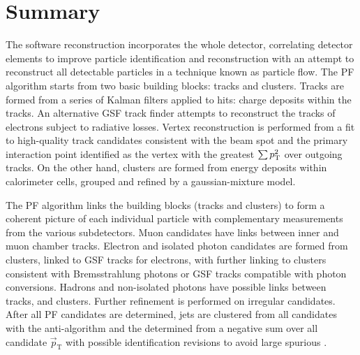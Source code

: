 \section{Summary}

The \CMS software reconstruction incorporates the whole detector, correlating detector elements to improve particle identification and reconstruction with an attempt to reconstruct all detectable particles in a technique known as particle flow. The PF algorithm starts from two basic building blocks: tracks and clusters. Tracks are formed from a series of Kalman filters applied to hits: charge deposits within the tracks. An alternative GSF track finder attempts to reconstruct the tracks of electrons subject to radiative losses.  Vertex reconstruction is performed from a fit to high-quality track candidates consistent with the beam spot and the primary interaction point identified as the vertex with the greatest $\sum p_{\text{T}}^2$ over outgoing tracks. On the other hand, clusters are formed from energy deposits within calorimeter cells, grouped and refined by a gaussian-mixture model.

The PF algorithm links the building blocks (tracks and clusters) to form a coherent picture of each individual particle with complementary measurements from the various subdetectors. Muon candidates have links between inner and muon chamber tracks. Electron and isolated photon candidates are formed from \ECAL clusters, linked to GSF tracks for electrons, with further linking to clusters consistent with Bremsstrahlung photons or GSF tracks compatible with photon conversions. Hadrons and non-isolated photons have possible links between tracks, \HCAL and \ECAL clusters. Further refinement is performed on irregular candidates. After all PF candidates are determined, jets are clustered from all candidates with the anti-\kt algorithm and the \ptmiss determined from a negative sum over all candidate $\vec{p}_{\mathrm{T}}$ with possible identification revisions to avoid large spurious \ptmiss.

